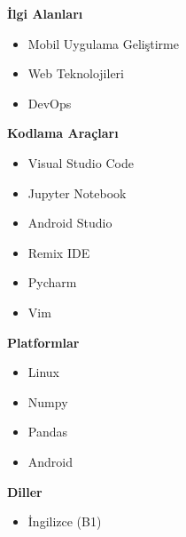 \documentclass[a4paper,11pt]{article}
\begin{document}
\vspace{0.9em}
\noindent
\begin{minipage}[t]{0.48\textwidth}
    \textbf{İlgi Alanları}
    \vspace{0.5em}
    \begin{itemize}[leftmargin=2em]
        \item Mobil Uygulama Geliştirme
		\item Web Teknolojileri
        \item DevOps
    \end{itemize}
\end{minipage}%
\hfill
\begin{minipage}[t]{0.48\textwidth}
    \textbf{Kodlama Araçları}
    \vspace{0.5em}
    \begin{itemize}[leftmargin=2em]
        \item Visual Studio Code
        \item Jupyter Notebook
        \item Android Studio
        \item Remix IDE
        \item Pycharm
        \item Vim
    \end{itemize}
\end{minipage}


\vspace{0.9em}
\noindent
\begin{minipage}[t]{0.48\textwidth}
    \textbf{Platformlar}
    \vspace{0.5em}
    \begin{itemize}[leftmargin=2em]
        \item Linux
        \item Numpy
        \item Pandas
        \item Android
    \end{itemize}
\end{minipage}%
\hfill
\begin{minipage}[t]{0.48\textwidth}
    \textbf{Diller}
    \vspace{0.5em}
    \begin{itemize}[leftmargin=2em]
        \item İngilizce (B1)
    \end{itemize}
\end{minipage}
\end{document}
